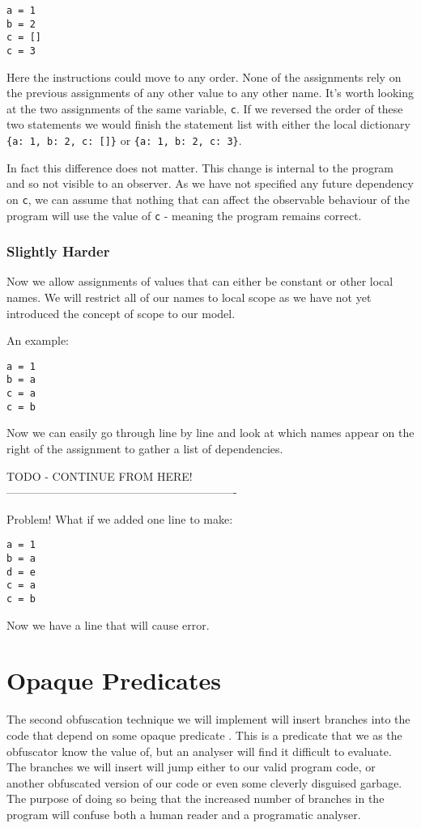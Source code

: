 \documentclass{report}
\begin{document}
\begin{lstlisting}
a = 1
b = 2
c = []
c = 3
\end{lstlisting}

Here the instructions could move to any order. None of the assignments rely on the previous assignments of any other value to any other name. It's
worth looking at the two assignments of the same variable, \texttt{c}. If we reversed the order of these two statements we would finish the
statement list with either the local dictionary \texttt{\{a: 1, b: 2, c: []\}} or \texttt{\{a: 1, b: 2, c: 3\}}.

In fact this difference does not matter. This change is internal to the program and so not visible to an observer. As we have not specified
any future dependency on \texttt{c}, we can assume that nothing that can affect the observable behaviour of the program will use the value
of \texttt{c} - meaning the program remains correct.

\subsubsection{Slightly Harder}

Now we allow assignments of values that can either be constant or other local names. We will restrict all of our names to local scope as
we have not yet introduced the concept of scope to our model.

An example:

\begin{lstlisting}
a = 1
b = a
c = a
c = b
\end{lstlisting}

Now we can easily go through line by line and look at which names appear on the right of the assignment to gather a list of dependencies.

TODO - CONTINUE FROM HERE!-------------------------------------------------------------

Problem! What if we added one line to make:

\begin{lstlisting}
a = 1
b = a
d = e
c = a
c = b
\end{lstlisting}

Now we have a line that will cause error. 

\section{Opaque Predicates}

The second obfuscation technique we will implement will insert branches into the code that depend on
some opaque predicate \cite{taxobftrans}. This is a predicate that we as the obfuscator know the value of,
but an analyser will find it difficult to evaluate. The branches we will insert will jump either to our valid
program code, or another obfuscated version of our code or even some cleverly disguised garbage. The purpose of doing so being
that the increased number of branches in the program will confuse both a human reader and a programatic analyser.
\end{document}
